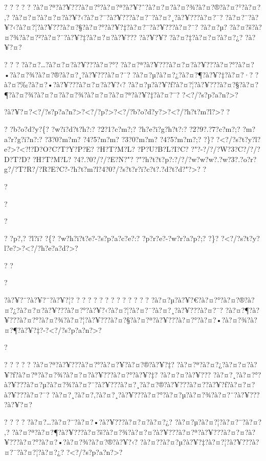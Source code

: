 \documentclass[11pt, openany]{book}
\begin{document}
{{{{{{{{{{{{{{{{{? ? ? ? ? ?à?¤?ª?à?¥???à?¤?°?à?¤?ª?à?¥?ˆ?à?¤?¤?à?¤?¾?à?¤?®?à?¤?¹?à?¤?‚?
?à?¤?¤?à?¤?¤?à?¥?‹?à?¤?¨?à?¥???à?¤?¯?à?¤?¸?à?¥???à?¤?¯?
?à?¤?¨?à?¥?‹?à?¤?¦?à?¥???à?¤?§?à?¤?°?à?¥?‡?à?¤?¨?à?¥???à?¤?¨? ?à?¤?µ?
?à?¤?š?à?¤?¾?à?¤?²?à?¤?¯?à?¥?‡?à?¤?¤?à?¥??? ?à?¥?¥? ?à?¤?‡?à?¤?¤?à?¤?¿?
?à?¥?¤?

? ? ? ?à?¤?\ldots{}?à?¤?¤?à?¥???à?¤?°?
?à?¤?ª?à?¥???à?¤?¤?à?¥???à?¤?°?à?¤?•?à?¤?¾?à?¤?®?à?¤?¸?à?¥???à?¤?¯?
?à?¤?µ?à?¤?¿?à?¤?¶?à?¥?‡?à?¤?·? ?à?¤?‰?à?¤?•?à?¥???à?¤?¤?à?¥?‹?
?à?¤?µ?à?¥?ƒ?à?¤?¦?à?¥???à?¤?§?à?¤?¶?à?¤?¾?à?¤?¤?à?¤?¾?à?¤?¤?à?¤?ª?à?¥?‡?à?¤?¨?
?\textless{}?/?s?p?a?n?\textgreater{}?

?à?¥?¤?\textless{}?/?s?p?a?n?\textgreater{}?\textless{}?/?p?\textgreater{}?\textless{}?/?b?o?d?y?\textgreater{}?\textless{}?/?h?t?m?l?\textgreater{}?
?

? ?b?o?d?y?\{? ?w?i?d?t?h?:? ?2?1?c?m?;? ?h?e?i?g?h?t?:? ?2?9?.?7?c?m?;?
?m?a?r?g?i?n?:? ?3?0?m?m? ?4?5?m?m? ?3?0?m?m? ?4?5?m?m?;? ?\}?
?\textless{}?/?s?t?y?l?e?\textgreater{}?\textless{}?!?D?O?C?T?Y?P?E?
?H?T?M?L? ?P?U?B?L?I?C? ?"?-?/?/?W?3?C?/?/?D?T?D? ?H?T?M?L?
?4?.?0?/?/?E?N?"?
?"?h?t?t?p?:?/?/?w?w?w?.?w?3?.?o?r?g?/?T?R?/?R?E?C?-?h?t?m?l?4?0?/?s?t?r?i?c?t?.?d?t?d?"?\textgreater{}?
?

?

?

?

? ?p?,? ?l?i? ?\{? ?w?h?i?t?e?-?s?p?a?c?e?:? ?p?r?e?-?w?r?a?p?;? ?\}?
?\textless{}?/?s?t?y?l?e?\textgreater{}?\textless{}?/?h?e?a?d?\textgreater{}?

? ?

?

?à?¥?¨?à?¥?¨?à?¥?¦? ? ? ? ? ? ? ? ? ? ? ? ? ?
?à?¤?µ?à?¥?€?à?¤?°?à?¤?®?à?¤?¿?à?¤?¤?à?¥???à?¤?°?à?¥?‹?à?¤?¦?à?¤?¯?à?¤?¸?à?¥???à?¤?¯?
?à?¤?¶?à?¥???à?¤?°?à?¤?¾?à?¤?¦?à?¥???à?¤?§?à?¤?ª?à?¥???à?¤?°?à?¤?•?à?¤?¾?à?¤?¶?à?¥?‡?-?\textless{}?/?s?p?a?n?\textgreater{}?

?

? ? ? ? ? ?à?¤?ª?à?¥???à?¤?°?à?¤?¥?à?¤?®?à?¥?‡?
?à?¤?ª?à?¤?¿?à?¤?¤?à?¥?ƒ?à?¤?ª?à?¤?¾?à?¤?¤?à?¥???à?¤?°?à?¥?‡?
?à?¤?¤?à?¥???
?à?¤?¸?à?¤?°?à?¥???à?¤?µ?à?¤?¾?à?¤?¨?à?¥???à?¤?¸?à?¤?®?à?¥???à?¤?­?à?¥?ƒ?à?¤?¤?à?¥???à?¤?¯?
?à?¤?¸?à?¤?‚?à?¤?¸?à?¥???à?¤?°?à?¤?µ?à?¤?¾?à?¤?¨?à?¥??? ?à?¥?¤?

? ? ? ? ?à?¤?\ldots{}?à?¤?¨?à?¤?•?à?¥???à?¤?¤?à?¤?¿?
?à?¤?µ?à?¤?¦?à?¤?¨?à?¤?‚?
?à?¤?ª?à?¤?¶?à?¥???à?¤?š?à?¤?¾?à?¤?¤?à?¥???à?¤?ª?à?¥???à?¤?¤?à?¥???à?¤?°?à?¤?•?à?¤?¾?à?¤?®?à?¥?‹?
?à?¤?­?à?¤?µ?à?¥?‡?à?¤?¦?à?¥???à?¤?¯?à?¤?¦?à?¤?¿?
?\textless{}?/?s?p?a?n?\textgreater{}?

}}}}}}}}}}}}}}}}}
\end{document}
